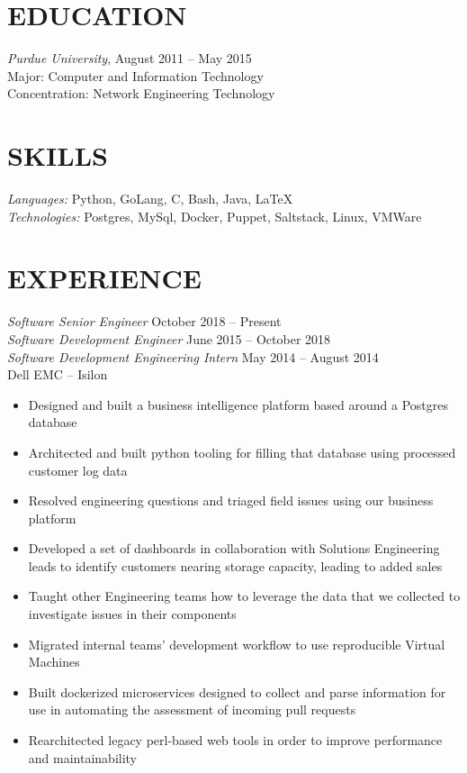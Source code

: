 \documentclass[line,margin]{res}
\begin{document}
  \name{\textcolor{TealBlue}{Ethan Madden}}
  \address{ethan@madden.ninja -- (812) 250-1419}%
  \address{2049 NW 60th St, Seattle WA 98107}

\begin{resume}
  \section{\textcolor{TealBlue}{EDUCATION}} 
    {\sl Purdue University}, \hfill August 2011 -- May 2015 \\%
      Major: Computer and Information Technology \\
      Concentration: Network Engineering Technology

  \section{\textcolor{TealBlue}{SKILLS}} 
    {\sl Languages:\/}  Python, GoLang, C, Bash, Java, \LaTeX{} \\
    {\sl Technologies:\/} Postgres, MySql, Docker, Puppet, Saltstack, Linux, VMWare

  \section{\textcolor{TealBlue}{EXPERIENCE}} 
    {\sl Software Senior Engineer\/} \hfill October 2018 -- Present \\%
    {\sl Software Development Engineer\/} \hfill June 2015 -- October 2018 \\%
    {\sl Software Development Engineering Intern\/} \hfill May 2014 -- August 2014 \\%
      Dell EMC -- Isilon %
      \begin{itemize} 
	\setlength{\itemsep}{-2pt}
        \item Designed and built a business intelligence platform based around a Postgres database
        \item Architected and built python tooling for filling that database using processed customer log data
        \item Resolved engineering questions and triaged field issues using our business platform
        \item Developed a set of dashboards in collaboration with Solutions Engineering leads to identify customers nearing storage capacity, leading to added sales
        \item Taught other Engineering teams how to leverage the data that we collected to investigate issues in their components
        \item Migrated internal teams' development workflow to use reproducible Virtual Machines
	\item Built dockerized microservices designed to collect and parse information for use in automating the assessment of incoming pull requests
	\item Rearchitected legacy perl-based web tools in order to improve performance and maintainability
      \end{itemize}


\end{resume}
\end{document}
